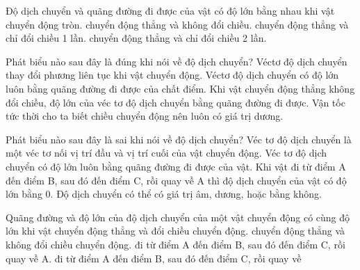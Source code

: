 \begin{ex}
Độ dịch chuyển và quãng đường đi được của vật có độ lớn bằng nhau khi vật
\choice
{chuyển động tròn.}
{\True chuyển động thẳng và không đổi chiều.}
{chuyển động thẳng và chỉ đổi chiều 1 lần.}
{chuyển động thẳng và chỉ đổi chiều 2 lần.}
\end{ex}

\begin{ex}
Phát biểu nào sau đây là đúng khi nói về độ dịch chuyển?
\choice
{Véctơ độ dịch chuyển thay đổi phương liên tục khi vật chuyển động.}
{Véctơ độ dịch chuyển có độ lớn luôn bằng quãng đường đi được của chất điểm.}
{\True Khi vật chuyển động thẳng không đổi chiều, độ lớn của véc tơ độ dịch chuyển bằng quãng đường đi được.}
{Vận tốc tức thời cho ta biết chiều chuyển động nên luôn có giá trị dương.}
\end{ex}

\begin{ex}
Phát biểu nào sau đây là sai khi nói về độ dịch chuyển?
\choice
{Véc tơ độ dịch chuyển là một véc tơ nối vị trí đầu và vị trí cuối của vật chuyển động.}
{\True Véc tơ độ dịch chuyển có độ lớn luôn bằng quãng đường đi được của vật.}
{Khi vật đi từ điểm A đến điểm B, sau đó đến điểm C, rồi quay về A thì độ dịch chuyển của vật có độ lớn bằng 0.}
{Độ dịch chuyển có thể có giá trị âm, dương, hoặc bằng không.}
\end{ex}

\begin{ex}
Quãng đường và độ lớn của độ dịch chuyển của một vật chuyển động có cùng độ lớn khi vật
\choice
{chuyển động thẳng và đổi chiều chuyển động.}
{\True chuyển động thẳng và không đổi chiều chuyển động.}
{đi từ điểm A đến điểm B, sau đó đến điểm C, rồi quay về A.}
{đi từ điểm A đến điểm B, sau đó đến điểm C, rồi quay về}
\end{ex}

